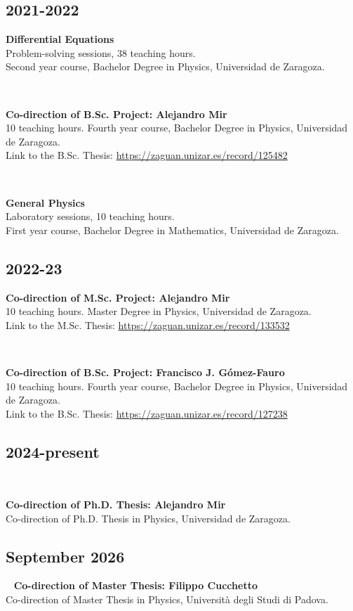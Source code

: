 \documentclass{cvf}
\begin{document}
\subsection{2021-2022}
\hspace{\parindent}\textbf{Differential Equations}\\
Problem-solving sessions, 38 teaching hours.\\
Second year course, Bachelor Degree in Physics, Universidad de Zaragoza.

~

\textbf{Co-direction of B.Sc. Project: Alejandro Mir}\\
10 teaching hours.
Fourth year course, Bachelor Degree in Physics, Universidad de Zaragoza.\\
Link to the B.Sc. Thesis: \url{https://zaguan.unizar.es/record/125482}

~

\textbf{General Physics}\\
Laboratory sessions, 10 teaching hours.\\
First year course, Bachelor Degree in Mathematics, Universidad de Zaragoza.

\subsection{2022-23}
\hspace{\parindent}\textbf{Co-direction of M.Sc. Project: Alejandro Mir}\\
10 teaching hours.
Master Degree in Physics, Universidad de Zaragoza.\\
Link to the M.Sc. Thesis: \url{https://zaguan.unizar.es/record/133532}

~

\textbf{Co-direction of B.Sc. Project: Francisco J. Gómez-Fauro}\\
10 teaching hours.
Fourth year course, Bachelor Degree in Physics, Universidad de Zaragoza.\\
Link to the B.Sc. Thesis: \url{https://zaguan.unizar.es/record/127238}

\subsection{2024-present}
~

\textbf{Co-direction of Ph.D. Thesis: Alejandro Mir}\\
Co-direction of Ph.D. Thesis in Physics, Universidad de Zaragoza.

\subsection{September 2026}
~
\textbf{Co-direction of Master Thesis: Filippo Cucchetto}\\
Co-direction of Master Thesis in Physics, Università degli Studi di Padova.
\end{document}
